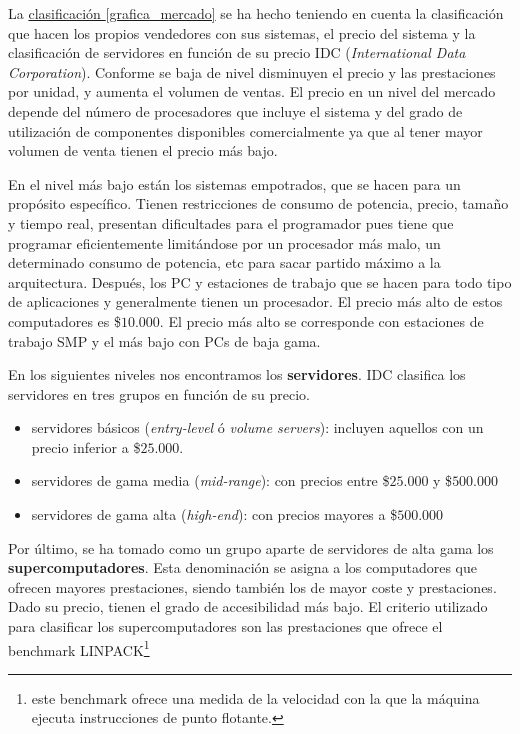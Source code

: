 \documentclass[10pt,a4paper,spanish]{report}
\begin{document}
\begin{enumerate}[\color{azul}{\bf $\heartsuit$}]
\begin{enumerate}[$\longrightarrow$]
La \hyperref[grafica_mercado]{clasificación \ref*{grafica_mercado}} se ha hecho teniendo en cuenta la clasificación que hacen los propios vendedores con sus sistemas, el precio del sistema y la clasificación de servidores en función de su precio IDC (\textit{\textcolor[rgb]{0.2,0.4,0.8}{International Data Corporation}}). Conforme se baja de nivel disminuyen el precio y las prestaciones por unidad, y aumenta el volumen de ventas. El precio en un nivel del mercado depende del número de procesadores que incluye el sistema y del grado de utilización de componentes disponibles comercialmente ya que al tener mayor volumen de venta tienen el precio más bajo.

En el nivel más bajo están los sistemas empotrados, que se hacen para un propósito específico. Tienen restricciones de consumo de potencia, precio, tamaño y tiempo real, presentan dificultades para el programador pues tiene que programar eficientemente limitándose por un procesador más malo, un determinado consumo de potencia, etc para sacar partido máximo a la arquitectura. Después, los PC y estaciones de trabajo que  se hacen para todo tipo de aplicaciones y generalmente tienen un procesador. El precio más alto de estos computadores es \$$10.000$. El precio más alto se corresponde con estaciones de trabajo SMP y el más bajo con PCs de baja gama.

En los siguientes niveles nos encontramos los \textbf{\textcolor[rgb]{0.2,0.4,0.8}{servidores}}. IDC clasifica los servidores en tres grupos en función de su precio.
\begin{itemize}
  \item servidores básicos (\textit{\textcolor[rgb]{0.2,0.4,0.8}{entry-level}} ó \textit{\textcolor[rgb]{0.2,0.4,0.8}{volume servers}}): incluyen aquellos con un precio inferior a \$$25.000$. 
  \item servidores de gama media (\textit{\textcolor[rgb]{0.2,0.4,0.8}{mid-range}}): con precios entre \$$25.000$ y \$$500.000$
  \item servidores de gama alta (\textit{\textcolor[rgb]{0.2,0.4,0.8}{high-end}}): con precios mayores a \$$500.000$
\end{itemize}

Por último, se ha tomado como un grupo aparte de servidores de alta gama los \textbf{\textcolor[rgb]{0.2,0.4,0.8}{supercomputadores}}. Esta denominación se asigna a los computadores que ofrecen mayores prestaciones, siendo también los de mayor coste y prestaciones. Dado su precio, tienen el grado de accesibilidad más bajo. El criterio utilizado para clasificar los supercomputadores son las prestaciones que ofrece el benchmark LINPACK\footnote{este benchmark ofrece una medida de la velocidad con la que la máquina ejecuta instrucciones de punto flotante.}


\end{enumerate}
\end{enumerate}
\end{document}
